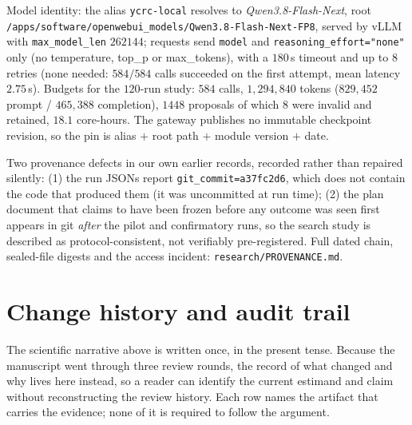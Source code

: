 \documentclass[11pt]{article}
\newcommand{\MODEL}{\textit{Qwen3.8-Flash-Next}}
\begin{document}
Model identity: the alias \texttt{ycrc-local} resolves to \MODEL{}, root
\texttt{/apps/software/\allowbreak openwebui\_models/\allowbreak Qwen3.8-Flash-Next-FP8},
served by vLLM with
\texttt{max\_model\_len} $262144$; requests send \texttt{model} and
\texttt{reasoning\_effort="none"} only (no temperature, top\_p or max\_tokens), with a
$180$\,s timeout and up to $8$ retries (none needed: $584/584$ calls succeeded on the first
attempt, mean latency $2.75$\,s). Budgets for the $120$-run study: $584$ calls,
$1{,}294{,}840$ tokens ($829{,}452$ prompt / $465{,}388$ completion), $1448$ proposals of
which $8$ were invalid and retained, $18.1$ core-hours. The gateway publishes no immutable
checkpoint revision, so the pin is alias $+$ root path $+$ module version $+$ date.

Two provenance defects in our own earlier records, recorded rather than repaired
silently: (1) the run JSONs report \texttt{git\_commit=a37fc2d6}, which does not contain
the code that produced them (it was uncommitted at run time); (2) the plan document that
claims to have been frozen before any outcome was seen first appears in git
\emph{after} the pilot and confirmatory runs, so the search study is described as
protocol-consistent, not verifiably pre-registered. Full dated chain, sealed-file digests
and the access incident: \texttt{research/PROVENANCE.md}.
\section{Change history and audit trail}
\label{app:audit}

The scientific narrative above is written once, in the present tense. Because the manuscript
went through three review rounds, the record of what changed and why lives here instead, so a
reader can identify the current estimand and claim without reconstructing the review history.
Each row names the artifact that carries the evidence; none of it is required to follow the
argument.
\end{document}

